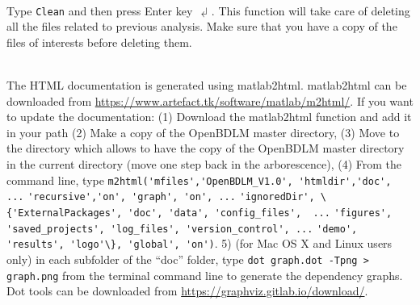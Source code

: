\begin{description}[style=unboxed]
\item[\textbf{How can I clean my OpenBDLM working directory ?}] \leavevmode \\
Type  \colorbox{light-gray}{\lstinline[basicstyle = \mlttfamily \small, backgroundcolor = \color{light-gray}]!Clean!} and then press Enter key $\dlsh$. This function will take care of deleting all the files related to previous analysis. Make sure that you have a copy of the files of interests before deleting them.

\item[\textbf{Where does the HTML documentation come from ?}] \leavevmode \\
The HTML documentation is generated using matlab2html.
matlab2html can be downloaded from \url{https://www.artefact.tk/software/matlab/m2html/}.
If you want to update the documentation: (1) Download the matlab2html function and add it in your \MATLAB{} path (2) Make a copy of the OpenBDLM master directory, (3) Move to the directory which allows to have the copy of the OpenBDLM master directory in the current directory (move one step back in the arborescence), (4) From the \MATLAB{} command line, type \colorbox{light-gray}{\lstinline[basicstyle = \mlttfamily \small, backgroundcolor = \color{light-gray}]!m2html('mfiles','OpenBDLM_V1.0', 'htmldir','doc', ...!}
\colorbox{light-gray}{\lstinline[basicstyle = \mlttfamily \small, backgroundcolor = \color{light-gray}]!'recursive','on', 'graph', 'on', ...!}
\colorbox{light-gray}{\lstinline[basicstyle = \mlttfamily \small, backgroundcolor = \color{light-gray}]!'ignoredDir', \{'ExternalPackages', 'doc', 'data', 'config_files',  ...!}
\colorbox{light-gray}{\lstinline[basicstyle = \mlttfamily \small, backgroundcolor = \color{light-gray}]!'figures', 'saved_projects', 'log_files', 'version_control', ...!}
\colorbox{light-gray}{\lstinline[basicstyle = \mlttfamily \small, backgroundcolor = \color{light-gray}]!'demo', 'results', 'logo'\}, 'global', 'on')!}.
5) (for Mac OS X and Linux users only) in each subfolder of the ``doc'' folder, type \colorbox{light-gray}{\lstinline[basicstyle = \mlttfamily \small, backgroundcolor = \color{light-gray}]!dot graph.dot -Tpng > graph.png!} from the terminal command line to generate the dependency graphs. Dot tools can be downloaded from \url{https://graphviz.gitlab.io/download/}.

\item[\textbf{How to cite OpenBDLM ?}] \leavevmode \\


\end{description}
